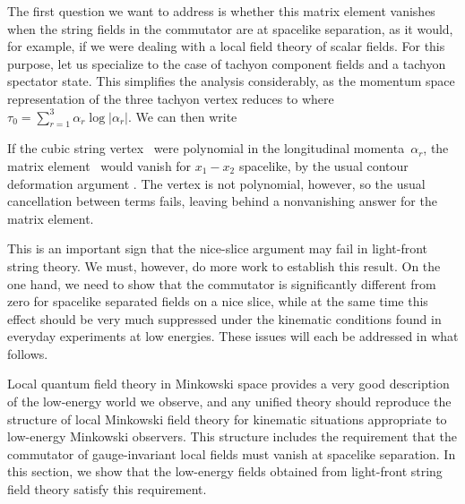 The first question we want to address is whether this matrix element
vanishes when the string fields in the commutator are at spacelike
separation, as it would, for example, if we were dealing with a local
field theory of scalar fields.  For this purpose, let us specialize
to the case of tachyon component fields and a tachyon spectator
state.
This simplifies the analysis considerably, as the momentum space
representation of the three tachyon vertex reduces to
\eqn{}
where $\tau_0 = \sum_{r=1}^3 \alpha_r \log | \alpha_r |$.
We can then write
\eqn{}

If the cubic string vertex \Tvert\ were polynomial in the
longitudinal momenta~$\alpha_r$, the matrix element \Mtach\ would
vanish
for
$x_1-x_2$ spacelike, by the usual contour deformation argument
.
The vertex is not polynomial, however, so the usual cancellation
between terms fails, leaving behind a nonvanishing answer for the
matrix element.

This is an important sign that the nice-slice argument may fail
in light-front string theory.  We must, however, do more work to
establish this result.  On the one hand, we need to show that the
commutator is significantly different from zero for spacelike
separated fields on a nice slice, while at the same time this
effect should be very much suppressed under the kinematic conditions
found in everyday experiments at low energies.  These issues will
each be addressed in what follows.


Local quantum field theory in Minkowski space provides a very good
description of the low-energy world we observe, and any unified
theory should reproduce the structure of local Minkowski field theory
for kinematic situations appropriate to low-energy Minkowski
observers.  This structure includes the requirement that the
commutator of gauge-invariant local fields must vanish at spacelike
separation.  In this section, we show that the low-energy fields
obtained from light-front string field theory satisfy this
requirement.

